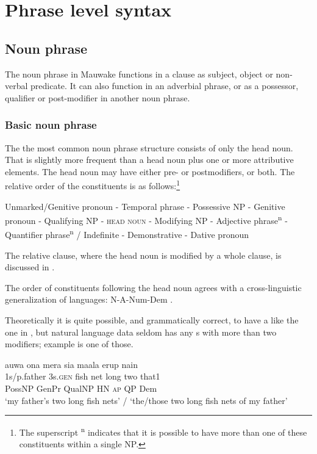 
\chapter{Phrase level syntax}
{}
\section{Noun phrase}\label{sec:4.1}
{}
The noun phrase in Mauwake functions in a clause as subject, object or non-verbal predicate. It can also function in an adverbial phrase, or as a possessor, qualifier or post-modifier in another noun phrase.

\subsection{Basic noun phrase} \label{sec:4.1.1}
{}
The the most common noun phrase structure consists of only the head noun. That is slightly more frequent than a head noun plus one or more attributive elements. The head noun may have either pre- or postmodifiers, or both. The relative order of the  constituents is as follows:\footnote{The superscript \textsuperscript{n} indicates that it is possible to have more than one of these constituents within a single NP.}

\ea
Unmarked/Genitive pronoun - Temporal phrase - Possessive NP - Genitive pronoun - Qualifying NP - \textsc{head} \textsc{noun} - Modifying NP - Adjective phrase\textsuperscript{n} - Quantifier phrase\textsuperscript{n} / Indefinite - Demonstrative - Dative pronoun
\z

The relative clause, where the head noun is modified by a whole clause, is discussed in .

The order of  constituents following the head noun agrees with a cross-linguistic generalization of  languages:  N-A-Num-Dem \citep[112]{Dryer2007a}.

Theoretically it is quite possible, and grammatically correct, to have a  like the one in , but natural language data seldom has any s with more than two modifiers; example  is one of those.
 

\ea%
\label{ex:4:x392}
\glll auwa  ona  mera  sia  maala  erup  nain \\
1s/p.father  3s.\textsc{gen}  fish  net  long  two  that1\\
PossNP  GenPr  QualNP  HN  \textsc{ap}  QP  Dem \\
\glt `my father's two long fish nets' / `the/those two long fish nets of my father'
\z

